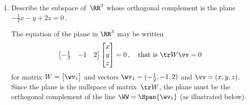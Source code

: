 \begin{example}
\begin{enumerate}
\item\label{eg:nulltrw:b} Describe the subspace of~\(\RR^3\) whose orthogonal complement is the plane \(-\tfrac12x-y+2z=0\)\,. 
\begin{solution} 
The equation of the plane in \(\RR^3\) may be written 
\begin{equation*}
\begin{bmatrix} -\tfrac12&-1&2 \end{bmatrix}
\begin{bmatrix} x\\y\\z \end{bmatrix}=0\,,
\quad\text{that is } \tr W\vv=0
\end{equation*}
for matrix \(W=\begin{bmatrix} \wv_1 \end{bmatrix}\) and vectors \(\wv_1=(-\tfrac12,-1,2)\) and \(\vv=(x,y,z)\).
Since the plane is the nullspace of matrix~\(\tr W\), the plane must be the orthogonal complement of the line \(\WW=\Span\{\wv_1\}\) (as illustrated below).
\begin{center}
\end{center}
\end{solution}



\end{enumerate}
\end{example}
